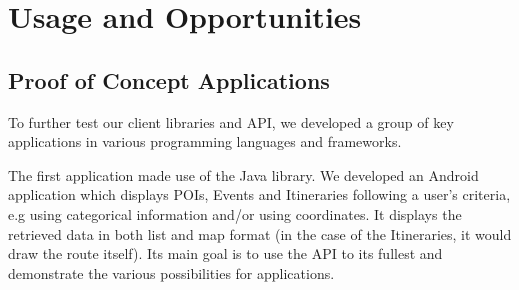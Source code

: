 \documentclass[times,doublespace]{ettauth}%
\begin{document}
\section{Usage and Opportunities}
\label{s:evaluation}


\subsection{Proof of Concept Applications}
To further test our client libraries and API, we developed a group of key applications in various programming languages and frameworks.

The first application made use of the Java library. 
We developed an Android application which displays \acp{POI}, Events and Itineraries following a user's criteria, e.g using categorical information and/or using coordinates. 
It displays the retrieved data in both list and map format (in the case of the Itineraries, it would draw the route itself). 
Its main goal is to use the API to its fullest and demonstrate the various possibilities for applications.
\end{document}

